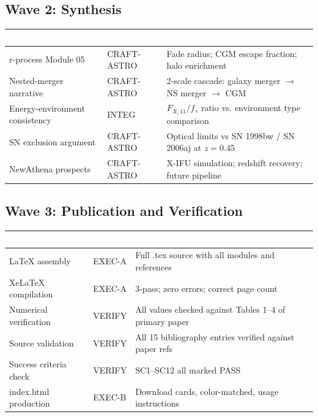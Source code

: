 \documentclass[11pt,letterpaper]{article}
\newcommand{\tableheader}[1]{\textbf{\sffamily\textcolor{white}{#1}}}
\begin{document}
\subsection{Wave 2: Synthesis}

\begin{center}
\begin{tabularx}{\textwidth}{L{3cm}C{2cm}X}
\toprule
{}
\tableheader{Task} & \tableheader{Agent} & \tableheader{Output} \\
\midrule
r-process Module 05 & CRAFT-ASTRO & Fade radius; CGM escape fraction; halo enrichment \\
Nested-merger narrative & CRAFT-ASTRO & 2-scale cascade: galaxy merger $\to$ NS merger $\to$ CGM \\
Energy-environment consistency & INTEG & $F_{X,11}/f_\gamma$ ratio vs. environment type comparison \\
SN exclusion argument & CRAFT-ASTRO & Optical limits vs SN 1998bw / SN 2006aj at $z=0.45$ \\
NewAthena prospects & CRAFT-ASTRO & X-IFU simulation; redshift recovery; future pipeline \\
\bottomrule
\end{tabularx}
\end{center}

\subsection{Wave 3: Publication and Verification}

\begin{center}
\begin{tabularx}{\textwidth}{L{3cm}C{2cm}X}
\toprule
{}
\tableheader{Task} & \tableheader{Agent} & \tableheader{Output} \\
\midrule
LaTeX assembly & EXEC-A & Full .tex source with all modules and references \\
XeLaTeX compilation & EXEC-A & 3-pass; zero errors; correct page count \\
Numerical verification & VERIFY & All values checked against Tables 1--4 of primary paper \\
Source validation & VERIFY & All 15 bibliography entries verified against paper refs \\
Success criteria check & VERIFY & SC1--SC12 all marked PASS \\
index.html production & EXEC-B & Download cards, color-matched, usage instructions \\
\bottomrule
\end{tabularx}
\end{center}
\end{document}
